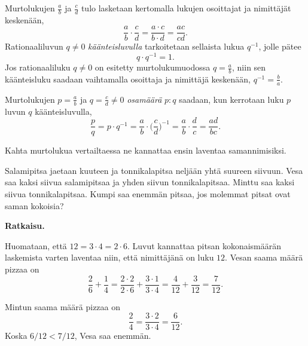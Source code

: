     Murtolukujen $\frac{a}{b}$ ja $\frac{c}{d}$ tulo lasketaan kertomalla lukujen osoittajat ja nimittäjät keskenään,
    \[
    \frac{a}{b}\cdot \frac{c}{d} = \frac{a\cdot c}{b\cdot d} = \frac{ac}{cd}.
    \]
    Rationaaliluvun $q\neq 0$ \emph{käänteisluvulla} tarkoitetaan sellaista lukua $q^{-1}$, jolle pätee
    \[
    q\cdot q^{-1} = 1.
    \]
    Jos rationaaliluku $q\neq 0$ on esitetty murtolukumuodossa $q=\frac{a}{b}$, niin sen käänteisluku saadaan vaihtamalla osoittaja ja nimittäjä keskenään,
    $q^{-1} = \frac{b}{a}$.
    
    Murtolukujen $p=\frac{a}{b}$ ja $q=\frac{c}{d}\neq 0$ \emph{osamäärä} $p : q$ saadaan, kun kerrotaan luku $p$ luvun $q$ käänteisluvulla,
    \[
    \frac{p}{q} = p\cdot q^{-1} = \frac{a}{b}\cdot\Big(\frac{c}{d}\Big)^{-1} = \frac{a}{b}\cdot \frac{d}{c}
    = \frac{ad}{bc}.
    \]
    
    
    
    
    Kahta murtolukua vertailtaessa ne kannattaa ensin laventaa samannimisiksi.
    
    \begin{esimerkki}
        Salamipitsa jaetaan kuuteen ja tonnikalapitsa neljään yhtä suureen
        siivuun. Vesa saa kaksi siivua salamipitsaa ja yhden siivun tonnikalapitsaa.
        Minttu saa kaksi siivua tonnikalapitsaa. Kumpi saa enemmän pitsaa, jos
        molemmat pitsat ovat saman kokoisia?
        
        
        \textbf{Ratkaisu.}
        
        Huomataan, että $12 = 3\cdot 4 = 2\cdot 6$. Luvut kannattaa
        pitsan kokonaismäärän laskemista varten laventaa niin, että
        nimittäjänä on luku $12$.
        Vesan saama määrä pizzaa on
        \[
            \frac{2}{6} + \frac{1}{4} = 
            \frac{2\cdot 2}{2\cdot 6} + \frac{3\cdot 1}{3\cdot 4} =
            \frac{4}{12}+\frac{3}{12} =
            \frac{7}{12}.
        \]
        
        Mintun saama määrä pizzaa on
        \[
            \frac{2}{4} =
            \frac{3\cdot 2}{3\cdot 4} =
            \frac{6}{12}.
        \]
        Koska $6/12 < 7/12$, Vesa saa enemmän.
    \end{esimerkki}
    
